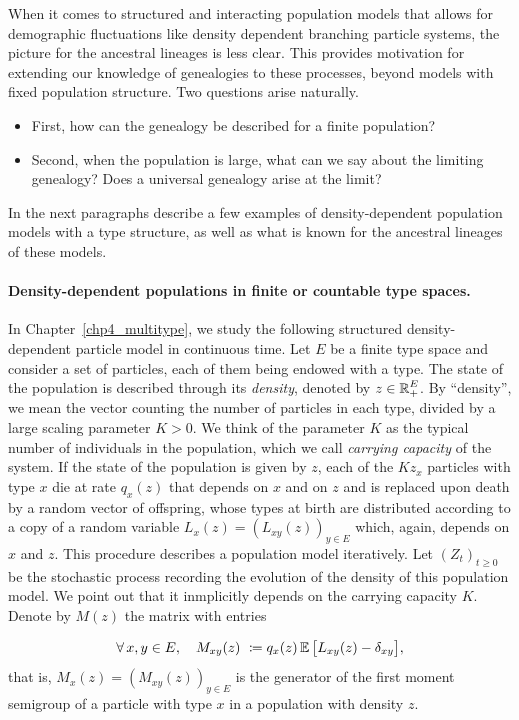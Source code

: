 When it comes to structured and interacting population models that allows for demographic fluctuations like density dependent branching particle systems, the picture for the ancestral lineages is less clear.
 This provides motivation for extending our knowledge
of genealogies to these processes, beyond models with fixed population
structure.
Two questions arise naturally.
\begin{itemize}
\item[(Q1)] First, how can the genealogy be described for a finite population?
\item[(Q2)]  Second, when the population is large, what can we say about the limiting genealogy? Does a universal genealogy  arise at the limit? 
\end{itemize}  
In the next paragraphs describe a few examples of density-dependent population models with a type structure, as well as what is known for the ancestral lineages of these models.

\paragraph{Density-dependent populations in finite or countable type spaces.}
In Chapter~\ref{chp4_multitype}, we study the following structured density-dependent particle model in continuous time. Let $E$ be a finite type space and consider a set of particles, each of them being endowed with a type. 
The state of the population is described through its \emph{density}, denoted by 
 $z\in \operatorname{\mathbb{R}}_+^E$. By ``density'', we mean the vector counting the number of particles in each type, divided by a large scaling parameter $K>0$. We think of the parameter $K$ as the typical number of individuals in the population, which we call \emph{carrying capacity} of the system. If the state of the population is given by $z$, each of the $Kz_x$ particles with type $x$ die at rate $q_x(z)$ that depends on $x$ and on $z$ and is replaced upon death by a random vector of offspring, whose types at birth are distributed according to a copy of a random variable $L_x(z)=(L_{xy}(z))_{y\in E}$ which, again, depends on $x$ and $z$. This procedure describes a population model iteratively. Let $(Z_t)_{t\geq 0}$ be the stochastic process recording the evolution of the density of this population model. We point out that it inmplicitly depends on the carrying capacity $K$.
Denote by $M(z)$ the matrix with entries

 \[
 \forall\, x,y\in E,\quad M_{xy}(z)\ \coloneqq q_x(z)\E\big[L_{xy}(z)-\delta_{xy}\big],
 \]
that is, $M_{x}(z)= (M_{xy}(z))_{y\in E}$ is the generator of the first moment semigroup of a particle with type $x$ in a population with density $z$.

